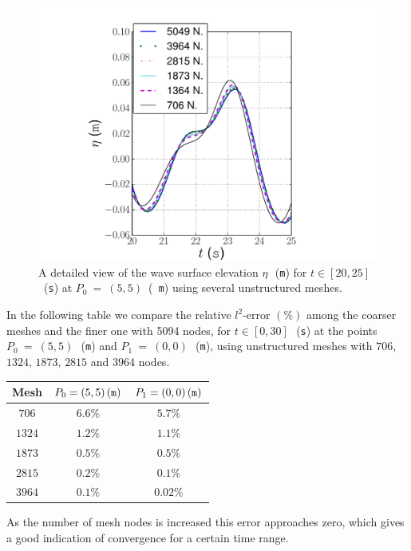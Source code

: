 \begin{figure}
  \centering
    \includegraphics[width=\largefig]{chapters/lopes/pdf/detail_unstr.pdf}
    \caption{A detailed view of the wave surface elevation
      $\eta$\,~({\tt m}) for $t\in[20,25]$~({\tt s}) at $P_0~=~(5,5)$~({\tt
        m}) using several unstructured meshes.}
  \label{fig:lopes:unstdetail}
\end{figure}

In the following table we compare the relative $l^2$-error $(\%)$
among the coarser meshes and the finer one with 5094 nodes, for
$t\in[0,30]$\,~({\tt s}) at the points $P_0~=~(5,5)$\,~({\tt m}) and
$P_1~=~(0,0)$\,~({\tt m}), using unstructured meshes with $706$,
$1324$, $1873$, $2815$ and $3964$ nodes.
%
\begin{center}
  \renewcommand{\arraystretch}{1.3}
  \begin{tabular}{ccc}
    \toprule
     Mesh & $P_0=(5,5)\,({\tt m})$ & $P_1=(0,0)\,({\tt m})$\\
     \midrule
     $706$ &$6.6\%$ & $5.7\%$ \\
     $1324$  &$1.2\%$    &$1.1\%$ \\
     $1873$ & $0.5\%$   & $0.5\%$ \\
     $2815$ & $0.2\%$  &$0.1\%$  \\
     $3964$ & $0.1\%$    &$0.02\%$\\
     \bottomrule
  \end{tabular}
\end{center}
%
As the number of mesh nodes is increased this error approaches zero,
which gives a good indication of convergence for a certain time range.

